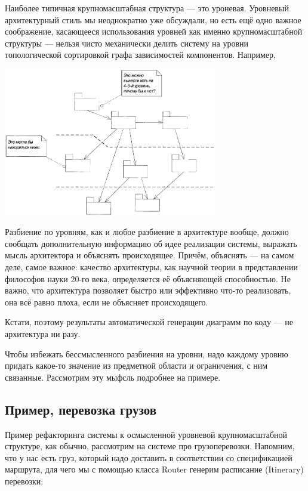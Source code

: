 \documentclass{../../text-style}
\begin{document}
Наиболее типичная крупномасштабная структура --- это уроневая. Уровневый архитектурный стиль мы неоднократно уже обсуждали, но есть ещё одно важное соображение, касающееся использования уровней как именно крупномасштабной структуры --- нельзя чисто механически делить систему на уровни топологической сортировкой графа зависимостей компонентов. Например,

\begin{center}
    \includegraphics[width=0.7\textwidth]{meaninglessLayers.png}
\end{center}

Разбиение по уровням, как и любое разбиение в архитектуре вообще, должно сообщать дополнительную информацию об идее реализации системы, выражать мысль архитектора и объяснять происходящее. Причём, объяснять --- на самом деле, самое важное: качество архитектуры, как научной теории в представлении философов науки 20-го века, определяется её объясняющей способностью. Не важно, что архитектура позволяет быстро или эффективно что-то реализовать, она всё равно плоха, если не объясняет происходящего.

Кстати, поэтому результаты автоматической генерации диаграмм по коду --- не архитектура ни разу.

Чтобы избежать бессмысленного разбиения на уровни, надо каждому уровню придать какое-то значение из предметной области и ограничения, с ним связанные. Рассмотрим эту мыфсль подробнее на примере.

\subsection{Пример, перевозка грузов}

Пример рефакторинга системы к осмысленной уровневой крупномасштабной структуре, как обычно, рассмотрим на системе про грузоперевозки. Напомним, что у нас есть груз, который надо доставить в соответствии со спецификацией маршрута, для чего мы с помощью класса Router генерим расписание (Itinerary) перевозки:
\end{document}
